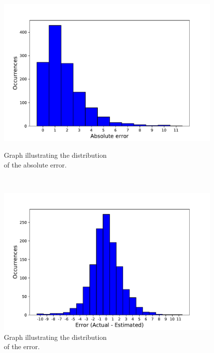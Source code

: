 

\begin{figure}[H]
\begin{minipage}[b]{8.5cm}
\centering
\includegraphics[width=1\textwidth]{images/absoluteerror}
\caption{Graph illustrating the distribution\\of the absolute error.}
\label{fig:absoluteerror}
\end{minipage}
\ \hspace{2mm} \
\begin{minipage}[b]{8.5cm}
\centering
\includegraphics[width=1\textwidth]{images/errorpres}
\caption{Graph illustrating the distribution\\of the error.}
\label{fig:errorpres}
\end{minipage}
\end{figure}

